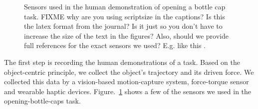 \begin{figure}
  \centering
    \caption{\scriptsize{Sensors used in the human demonstration of
        opening a bottle cap task.} FIXME why are you using scriptsize
      in the captions?  Is this the latex format from the journal?  Is
      it just so you don't have to increase the size of the text in
      the figures?  Also, should we provide full references for the
      exact sensors we used?  E.g. like this
      \citep{NetLogo2.1,unreal}.}
  \label{fig:devices}
\end{figure}

The first step is recording the human demonstrations of a task. Based on
the object-centric principle, we collect the object's trajectory and its
driven force. %
We collected this data by a vision-based motion-capture system,
force-torque sensor and wearable haptic
devices. Figure.~\ref{fig:devices} shows a few of the sensors we used
in the opening-bottle-caps task. %


